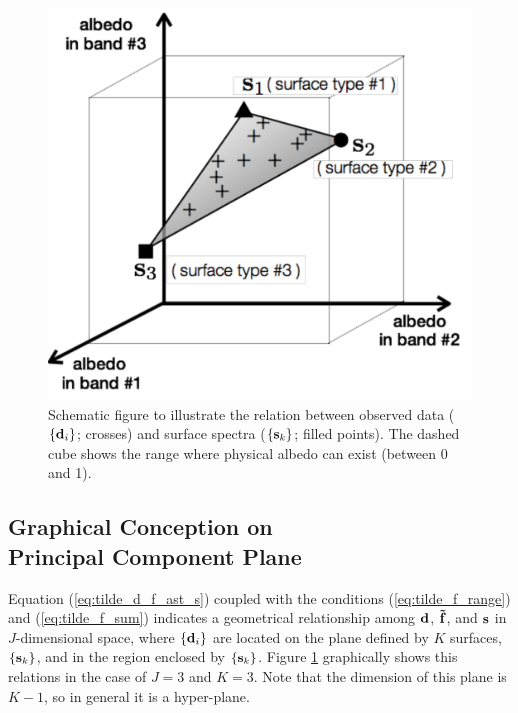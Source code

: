 \documentclass[iop,numberedappendix,apj]{emulateapj}
\def\fast{\tilde f}
\begin{document}
\begin{figure}[b!]
    \begin{center}
\includegraphics[width=0.8\hsize]{schematics_ver3.pdf}
    \end{center}
    \caption{Schematic figure to illustrate the relation between observed data ($\{{\bf d}_i\} $; crosses) and surface spectra ($\{{\bf s}_k\} $; filled points). The dashed cube shows the range where physical albedo can exist (between 0 and 1). }
\label{fig:schematic}
\end{figure}


\subsection{Graphical Conception on \\Principal Component Plane}
\label{ss:PCplane}

Equation (\ref{eq:tilde_d_f_ast_s}) coupled with the conditions (\ref{eq:tilde_f_range}) and (\ref{eq:tilde_f_sum}) indicates a geometrical relationship among ${\bf d}$, ${\bf \fast }$, and ${\bf s}$ in 
$J$-dimensional space, where $\{{\bf d}_i\}$ are located on the plane defined by $K$ surfaces, $\{{\bf s}_k\} $, and in the region enclosed by $\{{\bf s}_k\} $. 
Figure \ref{fig:schematic} graphically shows this relations in the case of $J=3$ and $K=3$. 
Note that the dimension of this plane is $K-1$, so in general it is a hyper-plane.  
\end{document}
